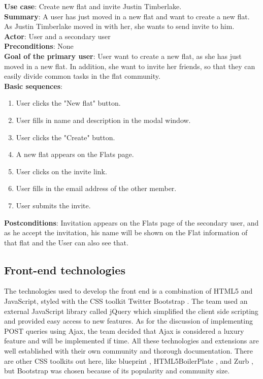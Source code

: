 \documentclass{sig-alt-release2}
\begin{document}
\noindent
\textbf{Use case}: Create new flat and invite Justin Timberlake. \\
\textbf{Summary}: A user has just moved in a new flat and want to create a new flat. As Justin Timberlake moved in with her, she wants to send invite to him. \\
\textbf{Actor}: User and a secondary user \\
\textbf{Preconditions}: None  \\
\textbf{Goal of the primary user}: User want to create a new flat, as she has just moved in a new flat. In addition, she want to invite her friends, so that they can easily divide common tasks in the flat community. \\
\textbf{Basic sequences}:
\begin{enumerate}
\item User clicks the "New flat" button.
\item User fills in name and description in the modal window.
\item User clicks the "Create" button.
\item A new flat appears on the Flats page.
\item User clicks on the invite link.
\item User fills in the email address of the other member.
\item User submits the invite.
\end{enumerate}
\textbf{Postconditions}: Invitation appears on the Flats page of the secondary
user, and as he accept the invitation, his name will be shown on the Flat
information of that flat and the User can also see that. \\

\subsection{Front-end technologies}

The technologies used to develop the front end is a combination of HTML5 and
JavaScript, styled with the CSS toolkit Twitter Bootstrap \cite{x14}. The team
used an external JavaScript library called jQuery \cite{x15} which simplified
the client side scripting and provided easy access to new features. As for the
discussion of implementing POST queries using Ajax, the team decided that Ajax
is considered a luxury feature and will be implemented if time. All these
technologies and extensions are well established with their own community and
thorough documentation. There are other CSS toolkits out here, like blueprint
\cite{x16}, HTML5BoilerPlate \cite{x17}, and Zurb \cite{x18}, but Bootstrap was
chosen because of its popularity and community size.
\end{document}

